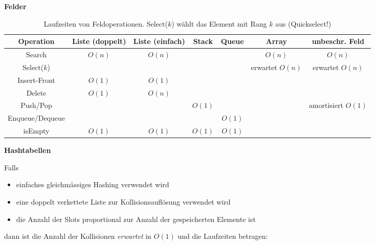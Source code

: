 \documentclass{letter}
\newcommand{\subsection}[1]{\medskip\bigskip

\noindent\textbf{\Large #1}}
\newcommand{\tmem}[1]{{\em #1\/}}
\newcommand{\tmstrong}[1]{\textbf{#1}}
\begin{document}
\subsection{Felder}

\begin{table}[h]
  \begin{tabular}{|c|c|c|c|c|c|c|}
    \hline
    {\tmstrong{Operation}} & {\tmstrong{Liste (doppelt)}} & {\tmstrong{Liste
    (einfach)}} & {\tmstrong{Stack}} & {\tmstrong{Queue}} & {\tmstrong{Array}}
    & {\tmstrong{unbeschr. Feld}}\\
    \hline
    Search & $O \left( n \right)$ & $O \left( n \right)$ &  &  & $O \left( n
    \right)$ & $O \left( n \right)$\\
    \hline
    Select($k$) &  &  &  &  & erwartet $O \left( n \right)$ & erwartet $O
    \left( n \right)$\\
    \hline
    Insert-Front & $O \left( 1 \right)$ & $O \left( 1 \right)$ &  &  &  & \\
    \hline
    Delete & $O \left( 1 \right)$ & $O \left( n \right)$ &  &  &  & \\
    \hline
    Push/Pop &  &  & $O \left( 1 \right)$ &  &  & amortisiert $O \left( 1
    \right)$\\
    \hline
    Enqueue/Dequeue &  &  &  & $O \left( 1 \right)$ &  & \\
    \hline
    isEmpty & $O \left( 1 \right)$ & $O \left( 1 \right)$ & $O \left( 1
    \right)$ & $O \left( 1 \right)$ &  & \\
    \hline
  \end{tabular}
  \caption{Laufzeiten von Feldoperationen. Select($k$) w\"ahlt das Element mit
  Rang $k$ aus (Quickselect!)}
\end{table}

\subsection{Hashtabellen}

Falls
\begin{itemize}
  \item einfaches gleichm\"assiges Hashing verwendet wird
  
  \item eine doppelt verkettete Liste zur Kollisionsaufl\"osung verwendet wird
  
  \item die Anzahl der Slots proportional zur Anzahl der gespeicherten
  Elemente ist
\end{itemize}
dann ist die Anzahl der Kollisionen {\tmem{erwartet}} in $O \left( 1 \right)$
und die Laufzeiten betragen:
\end{document}
